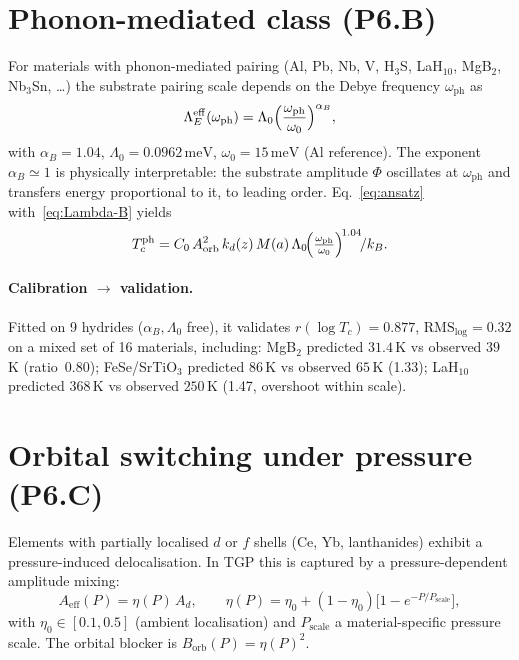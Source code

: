 \documentclass[11pt,a4paper]{article}
\renewcommand{\Phi}{\varPhi}
\newcommand{\meV}{\,\mathrm{meV}}
\newcommand{\LamE}{\Lambda_{E}}
\begin{document}
\section{Phonon-mediated class (P6.B)}\label{sec:P6B}

For materials with phonon-mediated pairing (Al, Pb, Nb, V, H$_{3}$S,
LaH$_{10}$, MgB$_{2}$, Nb$_{3}$Sn, \ldots) the substrate pairing scale
depends on the Debye frequency $\omega_{\mathrm{ph}}$ as
\begin{equation}\label{eq:Lambda-B}
  \LamE^{\mathrm{eff}}(\omega_{\mathrm{ph}})
  = \Lambda_{0}\,
    \!\Bigl(\frac{\omega_{\mathrm{ph}}}{\omega_{0}}\Bigr)^{\alpha_{B}},
\end{equation}
with $\alpha_{B}=1.04$, $\Lambda_{0}=0.0962\meV$, $\omega_{0}=15\meV$ (Al
reference). The exponent $\alpha_{B}\simeq 1$ is physically interpretable:
the substrate amplitude $\Phi$ oscillates at $\omega_{\mathrm{ph}}$ and
transfers energy proportional to it, to leading order. Eq.~\eqref{eq:ansatz}
with~\eqref{eq:Lambda-B} yields
\begin{equation}
  T_{c}^{\mathrm{ph}}
  = C_{0}\,A_{\mathrm{orb}}^{2}\,k_{d}(z)\,M(a)\,
    \Lambda_{0}\!\Bigl(\tfrac{\omega_{\mathrm{ph}}}{\omega_{0}}\Bigr)^{\!1.04}\!/k_{B}.
\end{equation}

\paragraph{Calibration $\to$ validation.} Fitted on 9 hydrides
($\alpha_{B},\Lambda_{0}$ free), it validates $r(\log T_{c})=0.877$,
$\mathrm{RMS}_{\log}=0.32$ on a mixed set of 16 materials, including:
MgB$_{2}$ predicted $31.4$\,K vs observed $39$\,K (ratio~0.80);
FeSe/SrTiO$_{3}$ predicted $86$\,K vs observed $65$\,K (1.33); LaH$_{10}$
predicted $368$\,K vs observed $250$\,K (1.47, overshoot within scale).

\section{Orbital switching under pressure (P6.C)}\label{sec:P6C}

Elements with partially localised $d$ or $f$ shells (Ce, Yb, lanthanides)
exhibit a pressure-induced delocalisation. In TGP this is captured by a
pressure-dependent amplitude mixing:
\begin{equation}\label{eq:eta}
  A_{\mathrm{eff}}(P) = \eta(P)\,A_{d},
  \qquad
  \eta(P) = \eta_{0} + (1-\eta_{0})\!\bigl[1 - e^{-P/P_{\mathrm{scale}}}\bigr],
\end{equation}
with $\eta_{0}\in[0.1,0.5]$ (ambient localisation) and $P_{\mathrm{scale}}$
a material-specific pressure scale. The orbital blocker is
$B_{\mathrm{orb}}(P)=\eta(P)^{2}$.
\end{document}
